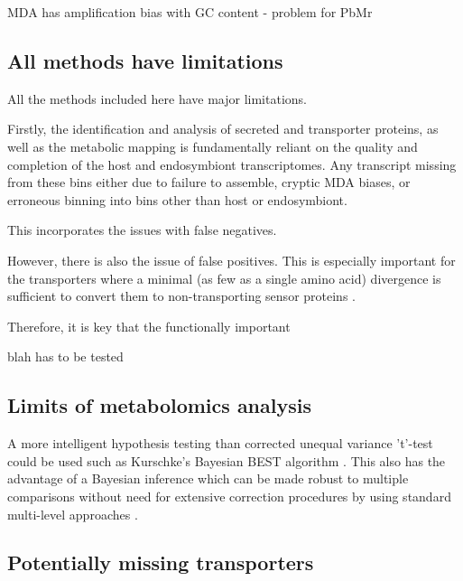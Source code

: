MDA has amplification bias with GC content - problem for PbMr \citep{Macaulay2014}


\subsection{All methods have limitations}

All the methods included here have major limitations.


Firstly, the identification and analysis of secreted and transporter proteins,
as well as the metabolic mapping is fundamentally reliant on the quality and completion
of the host and endosymbiont transcriptomes. 
Any transcript missing from these bins either due to failure to assemble, 
cryptic MDA biases, or erroneous binning into bins other than host or endosymbiont.

This incorporates the issues with false negatives. 




However, there is also the issue of false positives. 
This is especially important for the transporters where a minimal (as few as
a single amino acid) divergence is sufficient to convert them to non-transporting
sensor proteins \citep{Lalonde1999,Bianchi2010}.






Therefore, it is key that the functionally important 

blah has to be tested



\subsection{Limits of metabolomics analysis}

A more intelligent hypothesis testing than corrected unequal variance 't'-test
could be used such as Kurschke's Bayesian BEST algorithm \citep{Kruschke2013}.
This also has the advantage of a Bayesian inference which can be 
made robust to multiple comparisons without need for extensive correction
procedures by using standard multi-level approaches \citep{Gelman2009}.







\subsection{Potentially missing transporters}

